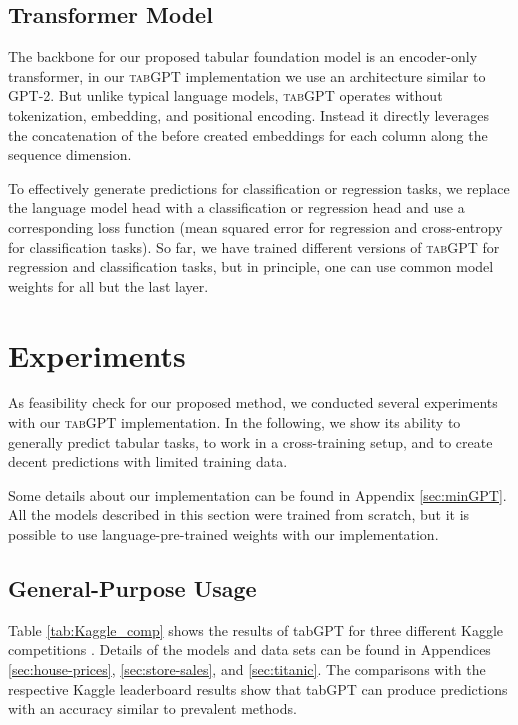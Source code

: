 \documentclass{article}
\begin{document}
\subsection{Transformer Model}
The backbone for our proposed tabular foundation model is an encoder-only transformer, in our \textsc{tabGPT} implementation we use an architecture similar to \textsc{GPT-2}. But unlike typical language models, \textsc{tabGPT} operates without tokenization, embedding, and positional encoding. Instead it directly leverages the concatenation of the before created embeddings for each column along the sequence dimension.

To effectively generate predictions for classification or regression tasks, we replace the language model head with a classification or regression head and use a corresponding loss function (mean squared error for regression and cross-entropy for classification tasks). So far, we have trained different versions of \textsc{tabGPT} for regression and classification tasks, but in principle, one can use common model weights for all but the last layer.


\section{Experiments}
\label{sec:experiments}

As feasibility check for our proposed method, we conducted several experiments with our \textsc{tabGPT} implementation. In the following, we show its ability to generally predict tabular tasks, to work in a cross-training setup, and to create decent predictions with limited training data.

Some details about our implementation can be found in Appendix \ref{sec:minGPT}. All the models described in this section were trained from scratch, but it is possible to use language-pre-trained weights with our implementation.

\subsection{General-Purpose Usage}
\label{sec:single-task-exp}
Table \ref{tab:Kaggle_comp} shows the results of tabGPT for three different Kaggle competitions \cite{house-prices,store-sales,spaceship-titanic}. Details of the models and data sets can be found in Appendices \ref{sec:house-prices}, \ref{sec:store-sales}, and \ref{sec:titanic}. The comparisons with the respective Kaggle leaderboard results show that tabGPT can produce predictions with an accuracy similar to prevalent methods.
\end{document}
